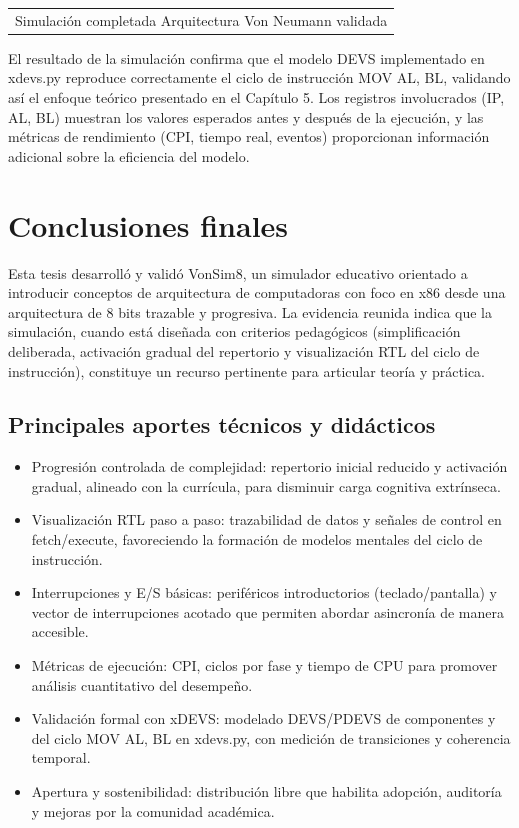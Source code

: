 \documentclass[12pt,oneside]{templates/unerthesis}
\providecommand{\tightlist}{%
  \setlength{\itemsep}{0pt}\setlength{\parskip}{0pt}}
\begin{document}
\begin{longtable}[]{@{}l@{}}
\toprule\noalign{}
\endhead
\bottomrule\noalign{}
\endlastfoot
Simulación completada Arquitectura Von Neumann validada \\
\end{longtable}

El resultado de la simulación confirma que el modelo DEVS implementado en xdevs.py reproduce correctamente el ciclo de instrucción MOV AL, BL, validando así el enfoque teórico presentado en el Capítulo 5. Los registros involucrados (IP, AL, BL) muestran los valores esperados antes y después de la ejecución, y las métricas de rendimiento (CPI, tiempo real, eventos) proporcionan información adicional sobre la eficiencia del modelo.

\hypertarget{conclusiones}{%
\chapter{Conclusiones finales}\label{conclusiones}}

Esta tesis desarrolló y validó VonSim8, un simulador educativo orientado a introducir conceptos de arquitectura de computadoras con foco en x86 desde una arquitectura de 8 bits trazable y progresiva. La evidencia reunida indica que la simulación, cuando está diseñada con criterios pedagógicos (simplificación deliberada, activación gradual del repertorio y visualización RTL del ciclo de instrucción), constituye un recurso pertinente para articular teoría y práctica.

\hypertarget{principales-aportes-tuxe9cnicos-y-diduxe1cticos}{%
\section{Principales aportes técnicos y didácticos}\label{principales-aportes-tuxe9cnicos-y-diduxe1cticos}}

\begin{itemize}
\tightlist
\item
  Progresión controlada de complejidad: repertorio inicial reducido y activación gradual, alineado con la currícula, para disminuir carga cognitiva extrínseca.
\item
  Visualización RTL paso a paso: trazabilidad de datos y señales de control en fetch/execute, favoreciendo la formación de modelos mentales del ciclo de instrucción.
\item
  Interrupciones y E/S básicas: periféricos introductorios (teclado/pantalla) y vector de interrupciones acotado que permiten abordar asincronía de manera accesible.
\item
  Métricas de ejecución: CPI, ciclos por fase y tiempo de CPU para promover análisis cuantitativo del desempeño.
\item
  Validación formal con xDEVS: modelado DEVS/PDEVS de componentes y del ciclo MOV AL, BL en xdevs.py, con medición de transiciones y coherencia temporal.
\item
  Apertura y sostenibilidad: distribución libre que habilita adopción, auditoría y mejoras por la comunidad académica.
\end{itemize}
\end{document}
